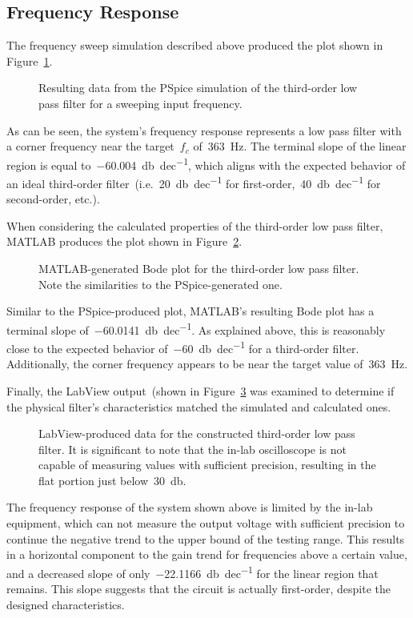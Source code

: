 \subsection{Frequency Response}
The frequency sweep simulation described above produced the plot shown in
Figure~\ref{f:bodePlotSim}.
%
\begin{figure}[H]
	\centering
	
	\parbox{.6\textwidth}{
	\caption[Simulated Bode Plot]{Resulting data from the PSpice simulation of
	the third-order low pass filter for a sweeping input frequency.}
	\label{f:bodePlotSim}}
\end{figure}
%
As can be seen, the system's frequency response represents a low pass filter
with a corner frequency near the target~$f_c$ of~\SI{363}{\hertz}.  The
terminal slope of the linear region is equal
to~\SI{-60.004}{\decibel\per dec}, which aligns with the expected behavior
of an ideal third-order filter~(i.e.~\SI{20}{\decibel\per dec} for
first-order,~\SI{40}{\decibel\per dec} for second-order, etc.).

When considering the calculated properties of the third-order low pass filter,
MATLAB produces the plot shown in Figure~\ref{f:bodePlotCalc}.
%
\begin{figure}[H]
	\centering
	
	\parbox{.6\textwidth}{
	\caption[Calculated Bode Plot]{MATLAB-generated Bode plot for the
	third-order low pass filter.  Note the similarities to the PSpice-generated
	one.}
	\label{f:bodePlotCalc}}
\end{figure}
%
Similar to the PSpice-produced plot, MATLAB's resulting Bode plot has a
terminal slope of~\SI{-60.0141}{\decibel\per dec}.  As explained above, this is
reasonably close to the expected behavior of~\SI{-60}{\decibel\per dec} for a
third-order filter.  Additionally, the corner frequency appears to be near the
target value of~\SI{363}{\hertz}.

Finally, the LabView output~(shown in Figure~\ref{f:bodePlotMeas} was
examined to determine if the physical filter's characteristics matched the
simulated and calculated ones.
%
\begin{figure}[H]
	\centering
	
	\parbox{.6\textwidth}{
	\caption[Measured Bode Plot]{LabView-produced data for the constructed
	third-order low pass filter.  It is significant to note that the in-lab
	oscilloscope is not capable of measuring values with sufficient precision,
	resulting in the flat portion just below~\SI{30}{\decibel}.}
	\label{f:bodePlotMeas}}
\end{figure}
%
The frequency response of the system shown above is limited by the in-lab
equipment, which can not measure the output voltage with sufficient precision
to continue the negative trend to the upper bound of the testing range.  This
results in a horizontal component to the gain trend for frequencies above a
certain value, and a decreased slope of only~\SI{-22.1166}{\decibel\per dec}
for the linear region that remains.  This slope suggests that the circuit is
actually first-order, despite the designed characteristics.

